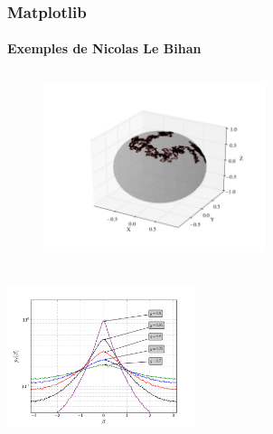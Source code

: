 \begin{frame}
\frametitle{Matplotlib}
\framesubtitle{Exemples de Nicolas Le Bihan}
\begin{minipage}{0.4\linewidth}
\begin{figure}
\includegraphics[width=6.5cm,height=5.5cm]{fig/BrownSphere.png}
\end{figure}
\end{minipage}
\hspace{1cm}
\begin{minipage}{0.4\linewidth}
\includegraphics[width=5.5cm,height=4.5cm]{fig/Distrib.png}
\end{minipage}
\end{frame}
